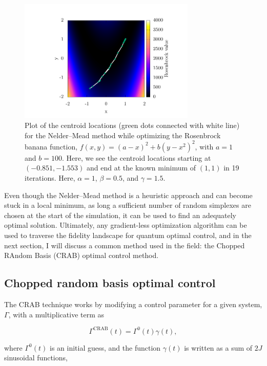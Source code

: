 \begin{figure}
\center \includegraphics[width=0.75\textwidth]{data/1d/NM/NM.pdf}
\caption{Plot of the centroid locations (green dots connected with white line) for the Nelder--Mead method while optimizing the Rosenbrock banana function, $f(x,y)=(a-x)^2+b(y-x^2)^2$, with $a=1$ and $b=100$.
Here, we see the centroid locations starting at $(-0.851,-1.553)$ and end at the known minimum of $(1,1)$ in 19 iterations.
Here, $\alpha = 1$, $\beta = 0.5$, and $\gamma = 1.5$.}
\label{fig:minimize_NM}
\end{figure}

Even though the Nelder--Mead method is a heuristic approach and can become stuck in a local minimum, as long a sufficient number of random simplexes are chosen at the start of the simulation, it can be used to find an adequately optimal solution.
Ultimately, any gradient-less optimization algorithm can be used to traverse the fidelity landscape for quantum optimal control, and in the next section, I will discuss a common method used in the field: the Chopped RAndom Basis (CRAB) optimal control method.

\subsection{Chopped random basis optimal control}
\label{sec:CRAB}

The CRAB technique works by modifying a control parameter for a given system, $\Gamma$, with a multiplicative term as

\begin{equation}
\Gamma^{\text{CRAB}}(t) = \Gamma^0(t)\gamma(t),
\end{equation}

\noindent where $\Gamma^0(t)$ is an initial guess, and the function $\gamma(t)$ is written as a sum of $2J$ sinusoidal functions,

